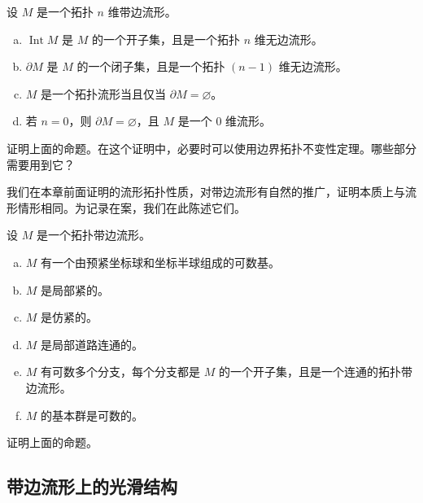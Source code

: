 \documentclass[../../main.tex]{subfiles}
\begin{document}
\begin{proposition}\label{proposition:ch01-带边流形基本性质}
设 $M$ 是一个拓扑 $n$ 维带边流形。
\begin{enumerate}[(a)]
\item $\operatorname{Int}M$ 是 $M$ 的一个开子集，且是一个拓扑 $n$ 维无边流形。
\item $\partial M$ 是 $M$ 的一个闭子集，且是一个拓扑 $(n-1)$ 维无边流形。
\item $M$ 是一个拓扑流形当且仅当 $\partial M=\varnothing$。
\item 若 $n=0$，则 $\partial M=\varnothing$，且 $M$ 是一个 $0$ 维流形。
\end{enumerate}
\end{proposition}

\begin{exercise}\label{exercise:ch01-1.39}
证明上面的命题。在这个证明中，必要时可以使用边界拓扑不变性定理。哪些部分需要用到它？
\end{exercise}

我们在本章前面证明的流形拓扑性质，对带边流形有自然的推广，证明本质上与流形情形相同。为记录在案，我们在此陈述它们。

\begin{proposition}\label{proposition:ch01-带边流形拓扑性质}
设 $M$ 是一个拓扑带边流形。
\begin{enumerate}[(a)]
\item $M$ 有一个由预紧坐标球和坐标半球组成的可数基。
\item $M$ 是局部紧的。
\item $M$ 是仿紧的。
\item $M$ 是局部道路连通的。
\item $M$ 有可数多个分支，每个分支都是 $M$ 的一个开子集，且是一个连通的拓扑带边流形。
\item $M$ 的基本群是可数的。
\end{enumerate}
\end{proposition}

\begin{exercise}\label{exercise:ch01-1.41}
证明上面的命题。
\end{exercise}

\subsection{带边流形上的光滑结构}\label{subsection:ch01-带边流形光滑结构}
\end{document}

